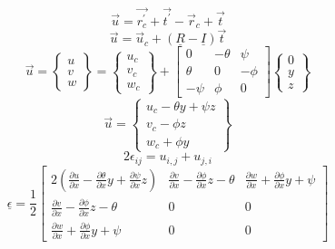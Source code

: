\begin{equation}\label{eq:DispVectorrptprt}
\vec{u}=\vec{r_c^\prime}+\vec{t^\prime}-\vec{r}_c+\vec{t}
\end{equation}
\begin{equation}\label{eq:DispVectRotTranst}
\vec{u}=\vec{u}_c+(\underline{R}-\underline{I})\vec{t}
\end{equation}
\begin{equation}\label{DispVectExpanded}
\vec{u} = \left\{\begin{array}{c}
	u\\
	v\\
	w\end{array}\right\}=\left\{\begin{array}{c}
	u_c\\
	v_c\\
	w_c\end{array}\right\}+\left[\begin{array}{ccc}
	0&-\theta&\psi\\
	\theta&0&-\phi\\
	-\psi&\phi&0
	\end{array}\right]\left\{\begin{array}{c}
	0\\
	y\\
	z\end{array}\right\}
\end{equation}
\begin{equation}\label{eq:DispVectEvaluated}
\vec{u}=\left\{\begin{array}{c}
u_c-\theta y+\psi z\\
v_c-\phi z\\
w_c+\phi y\end{array}\right\}
\end{equation}
\begin{equation}\label{eq:LinearStrainDispRelationship}
2\epsilon_{ij}=u_{i,j}+u_{j,i}
\end{equation}
\begin{equation}\label{eq:StrainEvaluated}
\underline{\epsilon}=\frac{1}{2}\left[\begin{array}{ccc}
2\left(\frac{\partial u}{\partial x}-\frac{\partial\theta}{\partial x}y+\frac{\partial\psi}{\partial x}z\right) & \frac{\partial v}{\partial x}-\frac{\partial\phi}{\partial x}z-\theta & \frac{\partial w}{\partial x}+\frac{\partial \phi}{\partial x}y+\psi\\
\frac{\partial v}{\partial x}-\frac{\partial\phi}{\partial x}z-\theta &0&0\\
\frac{\partial w}{\partial x}+\frac{\partial \phi}{\partial x}y+\psi&0&0\end{array}\right]
\end{equation}
